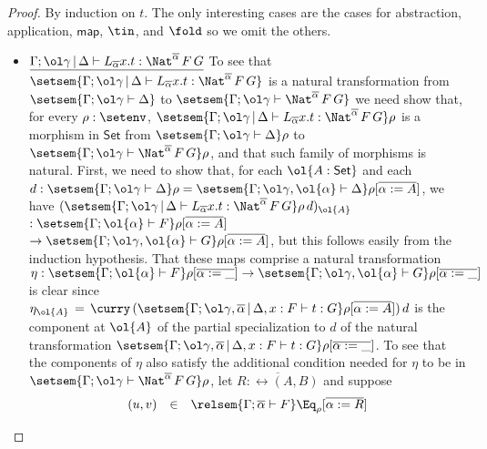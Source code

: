 \documentclass[acmsmall,review,anonymous]{acmart}
\theoremstyle{definition}
\newcommand{\set}{\mathsf{Set}}
\newcommand{\map}{\mathsf{map}}
\begin{document}
\begin{proof}
By induction on $t$. The only interesting cases are the cases for
abstraction, application, $\map$, $\tin$, and $\fold$ so we omit the
others.   
\begin{itemize}


\item 
$\underline{\Gamma;\ol\gamma \,|\, \Delta \vdash L_{\overline{\alpha}}
  x.t : \Nat^{\overline{\alpha}} \,F \,G}$ \;
  To see that $\setsem{\Gamma;\ol\gamma
    \,|\, \Delta \vdash L_{\overline{\alpha}} x.t :
    \Nat^{\overline{\alpha}} \,F \,G}$ is a natural transformation
  from $\setsem{\Gamma;\ol\gamma \vdash \Delta}$ to
  $\setsem{\Gamma;\ol\gamma \vdash \Nat^{\overline{\alpha}} \,F \,G}$
  we need show that, for every $\rho : \setenv$,
  $\setsem{\Gamma;\ol\gamma \,|\, \Delta \vdash L_{\overline{\alpha}}
    x.t : \Nat^{\overline{\alpha}} \,F \,G}\rho$ is a morphism in
  $\set$ from $\setsem{\Gamma; \ol\gamma \vdash \Delta}\rho$ to
  $\setsem{\Gamma; \ol\gamma \vdash \Nat^{\overline{\alpha}} \,F
    \,G}\rho$, and that such family of morphisms is natural.
  First, we need to show that, for each $\ol{A : \set}$ and each $d :
  \setsem{\Gamma;\ol\gamma \vdash \Delta}\rho = \setsem{\Gamma;
    \ol\gamma, \ol{\alpha} \vdash \Delta}\rho[\overline{\alpha := A}]$, we have
  $(\setsem{\Gamma;\ol\gamma \,|\, \Delta \vdash L_{\overline{\alpha}}
    x.t : \Nat^{\overline{\alpha}} \,F \,G}\rho\,d)_{\ol{A}}$ $:
  \setsem{\Gamma; \ol{\alpha} \vdash F}\rho[\overline{\alpha := A}]$
  $\to \setsem{\Gamma; \ol\gamma, \ol{\alpha} \vdash G}\rho[\overline{\alpha :=
      A}]$, but this follows easily from the induction hypothesis.
That these maps comprise a natural transformation $\eta :
\setsem{\Gamma; \ol{\alpha} \vdash F}\rho[\overline{\alpha := \_}] \to
\setsem{\Gamma; \ol\gamma, \ol{\alpha} \vdash G}\rho[\overline{\alpha := \_}]$ is
clear since $\eta_{\ol{A}} \, = \, \curry\,
(\setsem{\Gamma;\ol\gamma,\overline{\alpha} \,|\, \Delta, x : F \vdash t:
  G}\rho[\overline{\alpha := A}])\,d$ is the component at $\ol{A}$ of
the partial specialization to $d$ of the natural transformation
$\setsem{\Gamma;\ol\gamma,\overline{\alpha} \,|\, \Delta, x : F \vdash t:
  G}\rho[\overline{\alpha := \_}]$.  To see that the components of
$\eta$ also satisfy the additional condition needed for $\eta$ to
be in $\setsem{\Gamma;\ol\gamma \vdash \Nat^{\overline{\alpha}} \,F
  \,G}\rho$, let $\overline{R : \rel(A, B)}$ and suppose
\[\begin{array}{lll}
(u, v) &  \in & \relsem{\Gamma;\overline{\alpha} \vdash F}
\Eq_{\rho}[\overline{\alpha := R}]\\

\end{array}\]
\end{itemize}
\end{proof}
\end{document}
